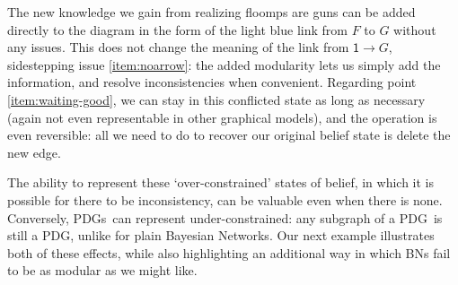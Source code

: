 \documentclass{article}
\newcommand\changed[1]{{\color{note-fg} #1}}
\newcommand{\MN}{PDG}%
\newcommand{\MNs}{PDGs}
\begin{document}
\begin{example}
		The new knowledge we gain from realizing floomps are guns can be added directly to the diagram in the form of the light blue link from $F$ to $G$ without any issues. This does not change the meaning of the link from $\mathsf 1 \to G$, sidestepping issue \ref{item:noarrow}: the added modularity lets us simply add the information, and resolve inconsistencies when convenient. 
		Regarding point \ref{item:waiting-good}, we can stay in this conflicted state as long as necessary (again not even representable in other graphical models), and the operation is even reversible: all we need to do to recover our original belief state is delete the new edge.			
	\end{example}			
	
	
	
	
%		
%		
	
	The ability to represent these `over-constrained' states of belief, in which it is possible for there to be inconsistency, can be valuable even when there is none. Conversely, \MNs\ can represent under-constrained: any subgraph of a \MN\ is still a \MN, unlike for plain Bayesian Networks. Our next example illustrates both of these effects, while also highlighting an additional way in which BNs fail to be as modular as we might like.
\end{document}
